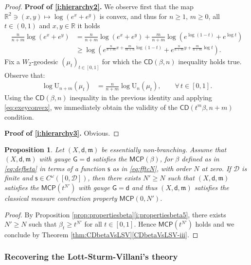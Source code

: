 \documentclass[11pt,a4paper]{article}
\theoremstyle{plain}
\newtheorem{proposition}[theorem]{Proposition}
\theoremstyle{definition}
\theoremstyle{remark}
\numberwithin{equation}{section}
\newcommand{\R}{\mathbb{R}} %
\newcommand{\CD}{\mathsf{CD}}
\newcommand{\MCP}{\mathsf{MCP}}
\newcommand{\U}{\mathrm{U}}
\newcommand{\cD}{\mathcal{D}}
\newcommand{\sfs}{\mathsf{s}}
\newcommand{\mm}{\mathfrak m}
\newcommand{\sfd}{\mathsf d}
\newcommand{\sfG}{\mathsf G}
\begin{document}
\begin{proof}
\textbf{Proof of \ref{i:hierarchy2}.} We observe first that the map $\R^2\ni (x,y)\mapsto \log(e^x+e^y)$ is convex, and thus for $n\geq 1$, $m\geq 0$, all $t\in (0,1)$ and $x,y\in \R$ it holds
\begin{align}
\frac{n}{n+m}\log(e^x+e^y) & = \frac{n}{n+m}\log(e^x+e^y) + \frac{m}{n+m}\log\left(e^{\log(1-t)}+e^{\log t}\right) \\ 
& \geq \log\left(e^{\tfrac{n}{n+m}x + \tfrac{m}{m+n}\log(1-t)} + e^{\tfrac{n}{n+m}y + \tfrac{m}{n+m}\log t} \right).\label{eq:exeyconvex}
\end{align}
Fix a $W_2$-geodesic $(\mu_t)_{t\in [0,1]}$ for which the $\CD(\beta,n)$ inequality holds true. Observe that:
\begin{align}
\log\U_{n+m}(\mu_t) & = \frac{n}{n+m} \log\U_{n}(\mu_t), \qquad \forall\, t \in [0,1].
\end{align}
Using the $\CD(\beta,n)$ inequality in the previous identity and applying \eqref{eq:exeyconvex}, we immediately obtain the validity of the $\CD(t^{m}\beta,n+m)$ condition.

\textbf{Proof of \ref{i:hierarchy3}.} Obvious.
\end{proof}

\begin{proposition}\label{prop:mcptoclassicalmcp} 
Let $(X,\sfd, \mm)$ be essentially non-branching. Assume that  $(X,\sfd, \mm)$ with gauge $\sfG=\sfd$ satisfies the $\MCP(\beta)$, for $\beta$ defined as in \eqref{eq:defbeta} in terms of a function $\sfs$ as in \eqref{eq:fftcN}, with order $N$ at zero. If $\cD$ is finite and $\sfs\in C^\omega([0,\cD])$, then there exists $N'\geq N$ such that $(X,\sfd,\mm)$ satisfies the $\MCP(t^{N'})$ with gauge $\sfG=\sfd$ and thus $(X,\sfd,\mm)$  satisfies the classical measure contraction property $\MCP(0,N')$.
\end{proposition}
\begin{proof}
By Proposition \ref{prop:propertiesbeta}\ref{i:propertiesbeta5}, there exists $N'\geq N$ such that $\beta_t \geq t^{N'}$ for all $t\in [0,1]$. Hence $\MCP(t^{N'})$ holds and we conclude by Theorem \ref{thm:CDbetaVsLSV}\ref{CDbetaVsLSV-iii}.
\end{proof}


\subsubsection{Recovering the Lott-Sturm-Villani's theory}\label{sec:howtorecover} 
\end{document}
